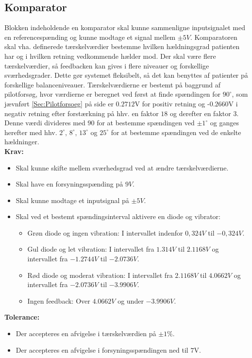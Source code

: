 \subsection{Komparator}\label{KomparatorAfs} 
Blokken indeholdende en komparator skal kunne sammenligne inputsignalet med en referencespænding og kunne modtage et signal mellem $\pm5V$. Komparatoren skal vha. definerede tærskelværdier bestemme hvilken hældningsgrad patienten har og i hvilken retning vedkommende hælder mod. Der skal være flere tærskelværdier, så feedbacken kan gives i flere niveauer og forskellige sværhedsgrader. Dette gør systemet fleksibelt, så det kan benyttes af patienter på forskellige balanceniveauer. Tærskelværdierne er bestemt på baggrund af pilotforsøg, hvor værdierne er beregnet ved først at finde spændingen for $90^{\circ}$, som jævnført \ref{Sec:Pilotforsoeg} på side \pageref{Sec:Pilotforsoeg} er $0.2712$V for positiv retning og -$0.2660$V i negativ retning efter forstærkning på hhv. en faktor $18$ og derefter en faktor $3$. Denne værdi divideres med $90$ for at bestemme spændingen ved $\pm1^{\circ}$ og ganges herefter med hhv. $2^{\circ}$,  $8^{\circ}$, $13^{\circ}$ og $25^{\circ}$ for at bestemme spændingen ved de enkelte hældninger.\\
\textbf{Krav:} 
\begin{itemize}
	\item Skal kunne skifte mellem sværhedsgrad ved at ændre tærskelværdierne.
	\item Skal have en forsyningsspænding på  $9V$.
	\item Skal kunne modtage et inputsignal på $\pm5V$. 
	\item Skal ved et bestemt spændingsinterval aktivere en diode og vibrator:
	\begin{itemize}
		\item Grøn diode og ingen vibration: I intervallet indenfor $0,324V$ til $-0,324V$.
		\item Gul diode og let vibration: I intervallet fra $1.314V$ til $2.1168V$ og intervallet fra $-1.2744V$ til $-2.0736V$.
		\item Rød diode og moderat vibration: I intervallet fra $2.1168V$ til $4.0662V$ og intervallet fra $-2.0736V$ til $-3.9906V$.
		\item Ingen feedback: Over $4.0662V$ og under $-3.9906V$. 
	\end{itemize}
\end{itemize}
\textbf{Tolerance:}
\begin{itemize}
	\item Der accepteres en afvigelse i tærskelværdien på $\pm1\%$.
	\item Der accepteres en afvigelse i forsyningsspændingen ned til $7$V.
\end{itemize}
